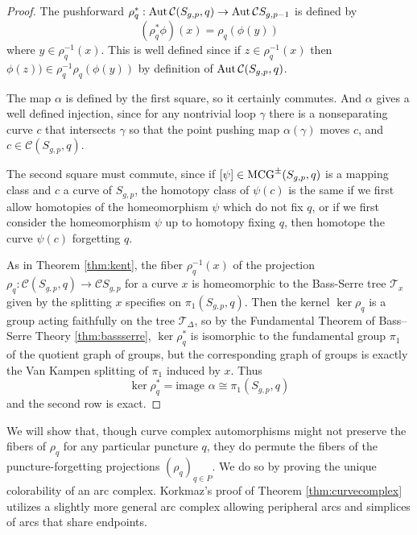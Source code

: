 \begin{proof}
  The pushforward $\rho^\ast_q: \operatorname{Aut} \mathcal C (S_{g,p},q)  \to
  \operatorname{Aut} \mathcal C S_{g,p-1}$
  is defined by
  $$
  (\rho^\ast_q \phi) (x) = \rho_q( \phi(y))
  $$
  where $y \in \rho^{-1}_q(x)$. This is well defined since if $z \in \rho^{-1}_q(x)$
  then $\phi(z))  \in \rho^{-1}_q \rho_q (\phi(y))$ by definition of $\operatorname{Aut} \mathcal C (S_{g,p},q)$.


  The map $\alpha$ is defined by the first square,
  so it certainly commutes.
  And $\alpha$
  gives a well defined injection,
  since for any nontrivial loop $\gamma$
  there is a nonseparating curve $c$
  that intersects $\gamma$ so that the point pushing map
  $\alpha(\gamma)$ moves $c$, and $c \in \mathcal C (S_{g,p},q)$.

  The second square must commute,
  since if $[\psi] \in \operatorname{MCG}^\pm (S_{g,p},q)$
  is a mapping class and $c$ a curve of $S_{g,p}$,
  the homotopy class of $\psi(c)$ is the same if we first
  allow homotopies of the homeomorphism $\psi$ which do not fix $q$, or if we first consider the homeomorphism $\psi$
  up to homotopy fixing $q$, then homotope the curve $\psi(c)$ forgetting $q$.

  As in  Theorem \ref{thm:kent},
  the fiber $\rho^{-1}_q(x)$ of the projection
  $\rho_q: \mathcal  C (S_{g,p},q) \to \mathcal C S_{g,p}$
  for a curve $x$
  is homeomorphic to the Bass-Serre
  tree $\mathcal T_x$ given by the splitting $x$ specifies on $\pi_1(S_{g,p},q)$.
  Then the kernel $\ker \rho_{q}$ is a
  group acting faithfully on the tree $\mathcal T_\Delta$,
  so by the
  Fundamental Theorem of Bass–Serre Theory
  \ref{thm:bassserre},
  $\ker \rho^\ast_{q}$ is isomorphic to
  the fundamental group $\pi_1$ of the
  quotient graph of groups,
  but the corresponding graph of groups is
  exactly the Van Kampen splitting of $\pi_1$ induced by $x$.
  Thus
  $$\ker \rho^\ast_{q} = \mbox{image } \alpha \cong \pi_1(S_{g,p},q)$$
  and the second row is exact.
\end{proof}

We will show that, though curve complex automorphisms might not
preserve the fibers of $\rho_q$ for any particular puncture $q$, they do permute the fibers
of the puncture-forgetting projections $(\rho_q)_{q \in P}$.
We do so by proving the unique colorability of an arc complex.
Korkmaz's proof of Theorem \ref{thm:curvecomplex}
utilizes a slightly more general arc complex
allowing peripheral arcs \cite{MR1696431} and simplices of arcs that share endpoints.


